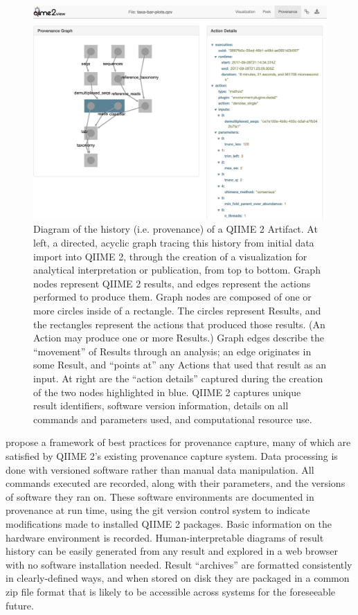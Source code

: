 \begin{figure}[htp]
\centering
\includegraphics[width=\textwidth]{figures/provenance_graph.png}
\caption[Diagram of the history (provenance) of a QIIME 2 Artifact]%
{Diagram of the history (i.e. provenance) of a QIIME 2 Artifact. At left, a
directed, acyclic graph tracing this history from initial data import into QIIME
2, through the creation of a visualization for analytical interpretation or
publication, from top to bottom. Graph nodes represent QIIME 2 results, and
edges represent the actions performed to produce them. Graph nodes are composed
of one or more circles inside of a rectangle. The circles represent Results, and
the rectangles represent the actions that produced those results. (An Action may
produce one or more Results.) Graph edges describe the “movement” of Results
through an analysis; an edge originates in some Result, and “points at” any
Actions that used that result as an input. At right are the “action details”
captured during the creation of the two nodes highlighted in blue. QIIME 2
captures unique result identifiers, software version information, details on all
commands and parameters used, and computational resource use.}
\label{fig:provenance_graph}
\end{figure}

\textcite{khan_sharing_2019} propose a framework of best practices for provenance capture,
many of which are satisfied by QIIME 2’s existing provenance capture system.
Data processing is done with versioned software rather than manual data
manipulation. All commands executed are recorded, along with their parameters,
and the versions of software they ran on. These software environments are
documented in provenance at run time, using the git version control system to
indicate modifications made to installed QIIME 2 packages. Basic information on
the hardware environment is recorded. Human-interpretable diagrams of result
history can be easily generated from any result and explored in a web browser
with no software installation needed. Result “archives” are formatted
consistently in clearly-defined ways, and when stored on disk they are packaged
in a common zip file format that is likely to be accessible across systems for
the foreseeable future.

